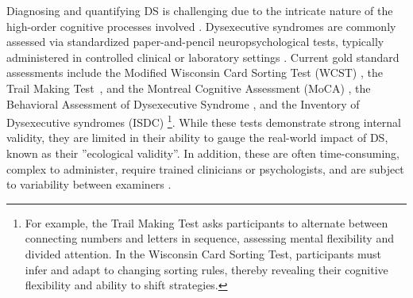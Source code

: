 





Diagnosing and quantifying DS is challenging due to the intricate nature of the high-order cognitive processes involved \cite{Tsai2021}. Dysexecutive syndromes are commonly assessed via standardized paper-and-pencil neuropsychological tests, typically administered in controlled clinical or laboratory settings \cite{Godefroy2010}. Current gold standard assessments include the Modified Wisconsin Card Sorting Test (WCST) \cite{Nelson1976}, the Trail Making Test~\cite{reitan1986trail}, and the Montreal Cognitive Assessment (MoCA) \cite{Freitas2013}, the Behavioral Assessment of Dysexecutive Syndrome \cite{Diamond2013}, and the Inventory of Dysexecutive syndromes (ISDC) \cite{Godefroy2010, Godefroy2008-sa}\footnote{For example, the Trail Making Test asks participants to alternate between connecting numbers and letters in sequence, assessing mental flexibility and divided attention. In the Wisconsin Card Sorting Test, participants must infer and adapt to changing sorting rules, thereby revealing their cognitive flexibility and ability to shift strategies.}.
While these tests demonstrate strong internal validity, they are limited in their ability to gauge the real-world impact of DS, known as their ”ecological validity”. In addition, these are often time-consuming, complex to administer, require trained clinicians or psychologists, and are subject to variability between examiners \cite{CHAN2008, Kessels2018, Borgnis2022}.

